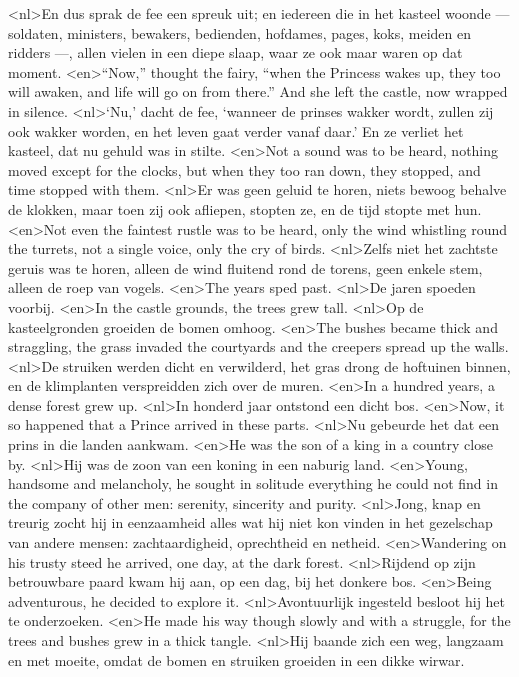 <nl>En dus sprak de fee een spreuk uit; en iedereen die in het kasteel woonde --- soldaten, ministers, bewakers, bedienden, hofdames, pages, koks, meiden en ridders ---, allen vielen in een diepe slaap, waar ze ook maar waren op dat moment. 
<en>“Now,” thought the fairy, “when the Princess wakes up, they too will awaken, and life will go on from there.” And she left the castle, now wrapped in silence.
<nl>`Nu,' dacht de fee, `wanneer de prinses wakker wordt, zullen zij ook wakker worden, en het leven gaat verder vanaf daar.' En ze verliet het kasteel, dat nu gehuld was in stilte.
<en>Not a sound was to be heard, nothing moved except for the clocks, but when they too ran down, they stopped, and time stopped with them.
<nl>Er was geen geluid te horen, niets bewoog behalve de klokken, maar toen zij ook afliepen, stopten ze, en de tijd stopte met hun.
<en>Not even the faintest rustle was to be heard, only the wind whistling round the turrets, not a single voice, only the cry of birds.
<nl>Zelfs niet het zachtste geruis was te horen, alleen de wind fluitend rond de torens, geen enkele stem, alleen de roep van vogels.
<en>The years sped past.
<nl>De jaren spoeden voorbij.
<en>In the castle grounds, the trees grew tall.
<nl>Op de kasteelgronden groeiden de bomen omhoog. 
<en>The bushes became thick and straggling, the grass invaded the courtyards and the creepers spread up the walls.
<nl>De struiken werden dicht en verwilderd, het gras drong de hoftuinen binnen, en de klimplanten verspreidden zich over de muren.
<en>In a hundred years, a dense forest grew up.
<nl>In honderd jaar ontstond een dicht bos.
<en>Now, it so happened that a Prince arrived in these parts.
<nl>Nu gebeurde het dat een prins in die landen aankwam.
<en>He was the son of a king in a country close by.
<nl>Hij was de zoon van een koning in een naburig land.
<en>Young, handsome and melancholy, he sought in solitude everything he could not find in the company of other men: serenity, sincerity and purity.
<nl>Jong, knap en treurig zocht hij in eenzaamheid alles wat hij niet kon vinden in het gezelschap van andere mensen: zachtaardigheid, oprechtheid en netheid. 
<en>Wandering on his trusty steed he arrived, one day, at the dark forest.
<nl>Rijdend op zijn betrouwbare paard kwam hij aan, op een dag, bij het donkere bos.
<en>Being adventurous, he decided to explore it.
<nl>Avontuurlijk ingesteld besloot hij het te onderzoeken.
<en>He made his way though slowly and with a struggle, for the trees and bushes grew in a thick tangle.
<nl>Hij baande zich een weg, langzaam en met moeite, omdat de bomen en struiken groeiden in een dikke wirwar. 
